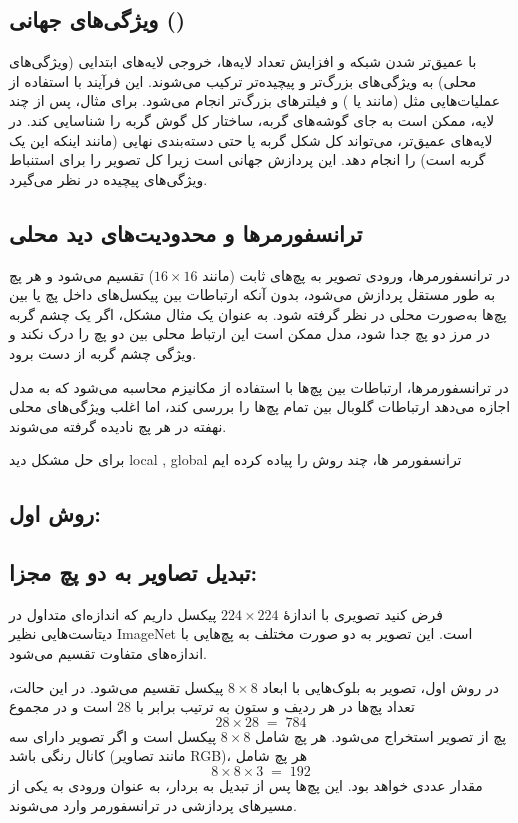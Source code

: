 \subsection{ویژگی‌های جهانی ()}
با عمیق‌تر شدن شبکه و افزایش تعداد لایه‌ها، خروجی لایه‌های ابتدایی (ویژگی‌های محلی) به ویژگی‌های بزرگ‌تر و پیچیده‌تر ترکیب می‌شوند. این فرآیند با استفاده از عملیات‌هایی مثل  (مانند  یا ) و فیلترهای بزرگ‌تر انجام می‌شود. برای مثال، پس از چند لایه،  ممکن است به جای گوشه‌های گربه، ساختار کل گوش گربه را شناسایی کند. در لایه‌های عمیق‌تر،  می‌تواند کل شکل گربه یا حتی دسته‌بندی نهایی (مانند اینکه این یک گربه است) را انجام دهد. این پردازش جهانی است زیرا کل تصویر را برای استنباط ویژگی‌های پیچیده در نظر می‌گیرد.

\subsection{ترانسفورمرها و محدودیت‌های دید محلی}
در ترانسفورمرها، ورودی تصویر به پچ‌های ثابت (مانند $16 \times 16$) تقسیم می‌شود و هر پچ به طور مستقل پردازش می‌شود، بدون آنکه ارتباطات بین پیکسل‌های داخل پچ یا بین پچ‌ها به‌صورت محلی در نظر گرفته شود. به عنوان یک مثال مشکل، اگر یک چشم گربه در مرز دو پچ جدا شود، مدل ممکن است این ارتباط محلی بین دو پچ را درک نکند و ویژگی چشم گربه از دست برود. 

در ترانسفورمرها، ارتباطات بین پچ‌ها با استفاده از مکانیزم  محاسبه می‌شود که به مدل اجازه می‌دهد ارتباطات گلوبال بین تمام پچ‌ها را بررسی کند، اما اغلب ویژگی‌های محلی نهفته در هر پچ نادیده گرفته می‌شوند.

برای حل مشکل دید local , global  ترانسفورمر ها، چند روش را پیاده کرده ایم 

\subsection{روش اول:}

\subsection{تبدیل تصاویر به دو پچ مجزا:}

فرض کنید تصویری با اندازهٔ $224 \times 224$ پیکسل داریم که اندازه‌ای متداول در دیتاست‌هایی نظیر ImageNet است. این تصویر به دو صورت مختلف به پچ‌هایی با اندازه‌های متفاوت تقسیم می‌شود. 

در روش اول، تصویر به بلوک‌هایی با ابعاد $8 \times 8$ پیکسل تقسیم می‌شود. در این حالت، تعداد پچ‌ها در هر ردیف و ستون به ترتیب برابر با  $28$ است و در مجموع 
\[
28 \times 28 \;=\; 784
\]
پچ از تصویر استخراج می‌شود. هر پچ شامل $8 \times 8$ پیکسل است و اگر تصویر دارای سه کانال رنگی باشد (مانند تصاویر RGB)، هر پچ شامل 
\[
8 \times 8 \times 3 \;=\; 192
\]
مقدار عددی خواهد بود. این پچ‌ها پس از تبدیل به بردار، به عنوان ورودی به یکی از مسیرهای پردازشی در ترانسفورمر وارد می‌شوند.

